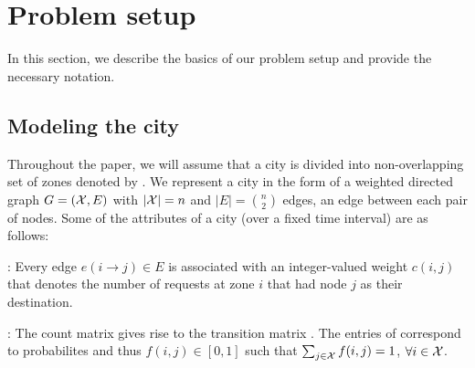 
\section{Problem setup}
\label{sec:problem_setup}

In this section, we describe the basics of our problem setup and provide the necessary notation.

\iffalse
\subsection{Notation}
\label{sec:notation}

Vectors are denoted with lowercase bold letters (e.g., $\vec{a} = [a(i)]$) and matrices are denoted with uppercase bold letters (e.g., $\matr{A} = [a(i,j)]$). The notation $\vec{1}$ refers to the vector of ones, with size dependent on the context. The short form notation $\vec{A_i}$ refers to the $i$-th row vector of the matrix $\matr{A}$. Let $\Theta_n$ be a set of $n \times n$ right-stochastic transition matrices (non-negative matrices with rows that sum to one). A probability simplex in $\mathbb{R}^n$ is denoted by $\Delta_n = \{\vec{p} \in \mathbb{R}^n_+ : \transpose{p} \vec{1} = 1 \}$.
\fi

\subsection{Modeling the city}

Throughout the paper, we will assume that a city is divided into non-overlapping set of zones denoted by \cityzones. 
We represent a city in the form of a weighted directed graph $G=(\mathcal{X}, E)$ with 
$|\mathcal{X}| = n$ and $|E| = {n \choose 2}$ edges, an edge between each pair of nodes. 
Some of the attributes of a city (over a fixed time interval) are as follows:


: 
Every edge $e(i\rightarrow j) \in E$ is associated with an
integer-valued weight $c(i,j)$ that denotes the number of requests
at zone $i$ that had node $j$ as their destination.

:
The count matrix gives rise to the transition matrix {\empiricaltransitionmatrix}.
The entries of {\empiricaltransitionmatrix} correspond to probabilites and thus
$f(i,j) \in [0,1]$ such that
$\sum_{j \in \mathcal{X}} f(i,j) = 1$, $\forall i \in \mathcal{X}$.

